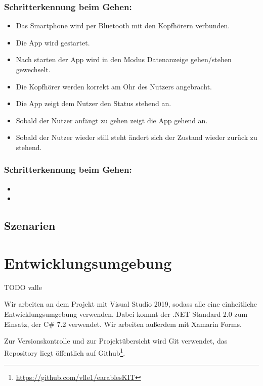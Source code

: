 \documentclass[a4paper,12pt]{article}
\begin{document}
  \subsubsection{Schritterkennung beim Gehen:}
  \begin{itemize}
    \item[]Das Smartphone wird per Bluetooth mit den Kopfhörern verbunden.
    \item[]Die App wird gestartet.
    \item[]Nach starten der App wird in den Modus \glqq Datenanzeige gehen/stehen\grqq{} gewechselt.
    \item[]Die Kopfhörer werden korrekt am Ohr des Nutzers angebracht.
    \item[]Die App zeigt dem Nutzer den Status \glqq stehend\grqq{} an.
    \item[]Sobald der Nutzer anfängt zu gehen zeigt die App \glqq gehend\grqq{} an.
    \item[]Sobald der Nutzer wieder still steht ändert sich der Zustand wieder zurück zu \glqq stehend\grqq. 
  \end{itemize}
  \subsubsection{Schritterkennung beim Gehen:}
  \begin{itemize}
    \item[] 
    \item[] 
  \end{itemize}
  \subsection{Szenarien}


\section{Entwicklungsumgebung}
TODO valle

Wir arbeiten an dem Projekt mit Visual Studio 2019, sodass alle eine einheitliche Entwicklungsumgebung verwenden.
Dabei kommt der .NET Standard 2.0 zum Einsatz, der C\# 7.2 verwendet. Wir arbeiten außerdem mit Xamarin Forms.

Zur Versionskontrolle und zur Projektübersicht wird Git verwendet, das Repository liegt öffentlich auf Github\footnote{\url{https://github.com/vlle1/earablesKIT}}.
\clearpage

\end{document}
